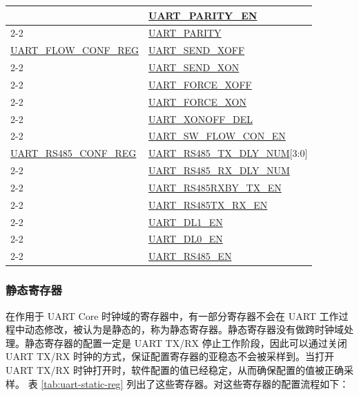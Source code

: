 \documentclass[main\_\_CN.tex]{subfiles}
\begin{document}
\begin{longtable}[c]{|p{6cm}|p{6cm}|}
 & \hyperref[fielddesc:UARTPARITYEN]{UART\_PARITY\_EN} \\\cline{2-2}
 & \hyperref[fielddesc:UARTPARITY]{UART\_PARITY} \\\hline
\hyperref[regdesc:UARTFLOWCONFREG]{UART\_FLOW\_CONF\_REG}  & \hyperref[fielddesc:UARTSENDXOFF]{UART\_SEND\_XOFF} \\\cline{2-2}
 & \hyperref[fielddesc:UARTSENDXON]{UART\_SEND\_XON} \\\cline{2-2}
 & \hyperref[fielddesc:UARTFORCEXOFF]{UART\_FORCE\_XOFF} \\\cline{2-2}
 & \hyperref[fielddesc:UARTFORCEXON]{UART\_FORCE\_XON} \\\cline{2-2}
 & \hyperref[fielddesc:UARTXONOFFDEL]{UART\_XONOFF\_DEL} \\\cline{2-2}
 & \hyperref[fielddesc:UARTSWFLOWCONEN]{UART\_SW\_FLOW\_CON\_EN} \\\hline
\hyperref[regdesc:UARTRS485CONFREG]{UART\_RS485\_CONF\_REG} & \hyperref[fielddesc:UARTRS485TXDLYNUM]{UART\_RS485\_TX\_DLY\_NUM}[3:0] \\\cline{2-2}
 & \hyperref[fielddesc:UARTRS485RXDLYNUM]{UART\_RS485\_RX\_DLY\_NUM} \\\cline{2-2}
 & \hyperref[fielddesc:UARTRS485RXBYTXEN]{UART\_RS485RXBY\_TX\_EN} \\\cline{2-2}
 & \hyperref[fielddesc:UARTRS485TXRXEN]{UART\_RS485TX\_RX\_EN} \\\cline{2-2}
 & \hyperref[fielddesc:UARTDL1EN]{UART\_DL1\_EN} \\\cline{2-2}
 & \hyperref[fielddesc:UARTDL0EN]{UART\_DL0\_EN} \\\cline{2-2}
 & \hyperref[fielddesc:UARTRS485EN]{UART\_RS485\_EN} \\\hline
\end{longtable}


\subsubsection{静态寄存器}\label{sec:uart-static-reg}

在作用于 UART Core 时钟域的寄存器中，有一部分寄存器不会在 UART 工作过程中动态修改，被认为是静态的，称为静态寄存器。静态寄存器没有做跨时钟域处理。静态寄存器的配置一定是 UART TX/RX 停止工作阶段，因此可以通过关闭 UART TX/RX 时钟的方式，保证配置寄存器的亚稳态不会被采样到。当打开 UART TX/RX 时钟打开时，软件配置的值已经稳定，从而确保配置的值被正确采样。
表 \ref{tab:uart-static-reg} 列出了这些寄存器。对这些寄存器的配置流程如下：
\end{document}
